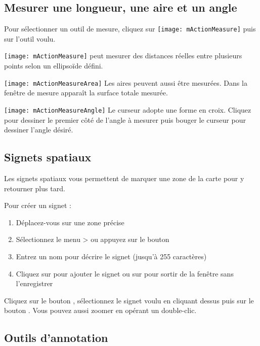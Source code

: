 \subsection{Mesurer une longueur, une aire et un angle}

Pour sélectionner un outil de mesure, cliquez sur \texttt{[image: mActionMeasure]} puis sur l'outil voulu.

\texttt{[image: mActionMeasure]} 
\qg peut mesurer des distances réelles entre plusieurs points selon un ellipsoïde défini. \par
\texttt{[image: mActionMeasureArea]} Les aires peuvent aussi être mesurées.
Dans la fenêtre de mesure apparaît la surface totale mesurée. \par
\texttt{[image: mActionMeasureAngle]}
Le curseur adopte une forme en croix. Cliquez pour dessiner le premier côté de l'angle à mesurer puis bouger le curseur pour dessiner l'angle désiré.

\subsection{Signets spatiaux} \label{sec:bookmarks}

Les signets spatiaux vous permettent de marquer une zone de la carte pour y retourner plus tard.

Pour créer un signet :
\begin{enumerate}
\item Déplacez-vous sur une zone précise
\item Sélectionnez le menu  >  ou appuyez sur le bouton 
\item Entrez un nom pour décrire le signet (jusqu'à 255 caractères)
\item Cliquez sur  pour ajouter le signet ou sur  pour sortir de la fenêtre sans l'enregistrer
\end{enumerate}

Cliquez sur le bouton , sélectionnez le signet voulu en cliquant dessus puis sur le bouton . Vous pouvez aussi zoomer en opérant un double-clic.

\subsection{Outils d'annotation}


